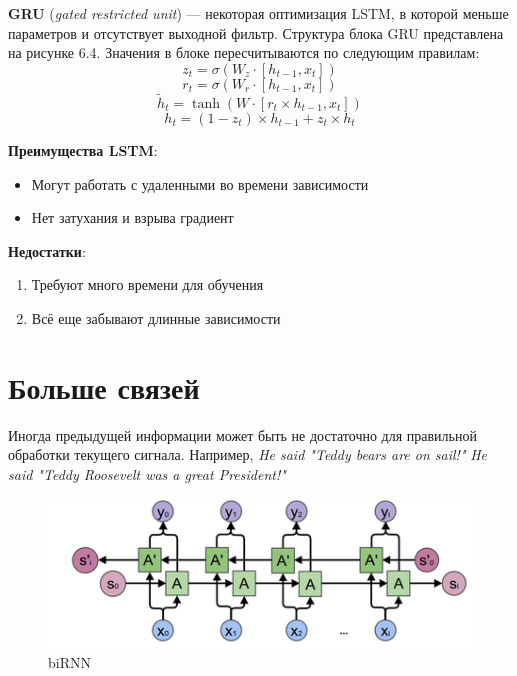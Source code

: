 \begin{definition}
    \textbf{GRU} (\textit{gated restricted unit}) --- некоторая оптимизация LSTM, в которой меньше параметров и отсутствует выходной фильтр. Структура блока GRU представлена на рисунке 6.4. Значения в блоке пересчитываются по следующим правилам:
    \[
        z_t=\sigma(W_z\cdot[h_{t-1},x_t])
    \]
    \[
        r_t=\sigma(W_r\cdot[h_{t-1},x_t])
    \]
    \[
        \widetilde{h}_t=\tanh(W\cdot[r_t\times h_{t-1},x_t])
    \]
    \[
        h_t=(1-z_t)\times h_{t-1} + z_t\times h_t
    \]
\end{definition}

\textbf{Преимущества LSTM}:
\begin{itemize}
    \item Могут работать с удаленными во времени зависимости
    \item Нет затухания и взрыва градиент
\end{itemize}

\textbf{Недостатки}:
\begin{enumerate}
    \item Требуют много времени для обучения
    \item Всё еще забывают длинные зависимости
\end{enumerate}

\section{Больше связей}

\begin{remark}
    Иногда предыдущей информации может быть не достаточно для правильной обработки текущего сигнала. Например,\newline
    \textit{He said "Teddy bears are on sail!"}\newline
    \textit{He said "Teddy Roosevelt was a great President!"}
\end{remark}

\begin{figure}[htb]
    \centering
    \includegraphics[scale=0.7]{images/birnn.png}
    \caption{biRNN}
\end{figure}

